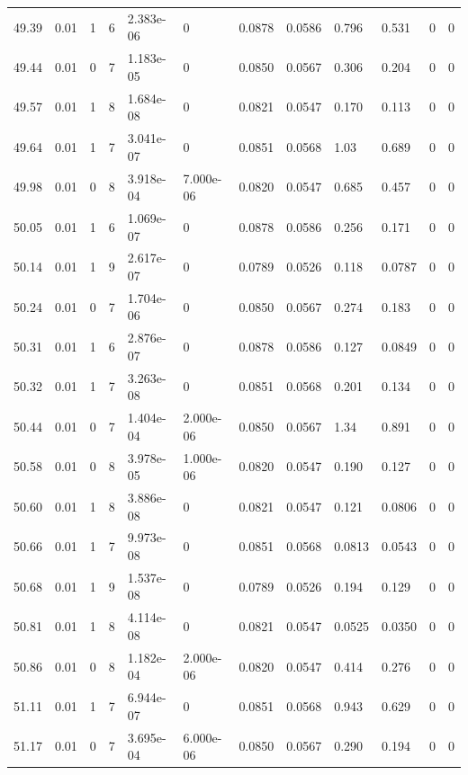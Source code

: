 \documentclass[preview]{standalone}
\begin{document}
{{{{{{{{{{{{{\begin{tabular}{L{1.2cm}C{1.2cm} C{0.3cm}C{0.5cm} C{1.4cm}C{1.4cm} C{1.4cm}C{1.4cm} C{1.6cm}C{1.6cm} C{1.6cm}C{1.6cm}}
  49.39  &  0.01  & 1     &  6 &  2.383e-06  & 0  &  0.0878&   0.0586& 0.796 & 0.531   &  0 & 0  \\ 
  49.44  &  0.01  & 0     &  7 &  1.183e-05  & 0  &  0.0850&   0.0567& 0.306 & 0.204   &  0 & 0  \\ 
  49.57  &  0.01  & 1     &  8 &  1.684e-08  & 0  &  0.0821&   0.0547& 0.170 & 0.113   &  0 & 0  \\ 
  49.64  &  0.01  & 1     &  7 &  3.041e-07  & 0  &  0.0851&   0.0568& 1.03 & 0.689   &  0 & 0  \\ 
  49.98  &  0.01  & 0     &  8 &  3.918e-04  & 7.000e-06  &  0.0820&   0.0547& 0.685 & 0.457   &  0 & 0  \\ 
  50.05  &  0.01  & 1     &  6 &  1.069e-07  & 0  &  0.0878&   0.0586& 0.256 & 0.171   &  0 & 0  \\ 
  50.14  &  0.01  & 1     &  9 &  2.617e-07  & 0  &  0.0789&   0.0526& 0.118 & 0.0787   &  0 & 0  \\ 
  50.24  &  0.01  & 0     &  7 &  1.704e-06  & 0  &  0.0850&   0.0567& 0.274 & 0.183   &  0 & 0  \\ 
  50.31  &  0.01  & 1     &  6 &  2.876e-07  & 0  &  0.0878&   0.0586& 0.127 & 0.0849   &  0 & 0  \\ 
  50.32  &  0.01  & 1     &  7 &  3.263e-08  & 0  &  0.0851&   0.0568& 0.201 & 0.134   &  0 & 0  \\ 
  50.44  &  0.01  & 0     &  7 &  1.404e-04  & 2.000e-06  &  0.0850&   0.0567& 1.34 & 0.891   &  0 & 0  \\ 
  50.58  &  0.01  & 0     &  8 &  3.978e-05  & 1.000e-06  &  0.0820&   0.0547& 0.190 & 0.127   &  0 & 0  \\ 
  50.60  &  0.01  & 1     &  8 &  3.886e-08  & 0  &  0.0821&   0.0547& 0.121 & 0.0806   &  0 & 0  \\ 
  50.66  &  0.01  & 1     &  7 &  9.973e-08  & 0  &  0.0851&   0.0568& 0.0813 & 0.0543   &  0 & 0  \\ 
  50.68  &  0.01  & 1     &  9 &  1.537e-08  & 0  &  0.0789&   0.0526& 0.194 & 0.129   &  0 & 0  \\ 
  50.81  &  0.01  & 1     &  8 &  4.114e-08  & 0  &  0.0821&   0.0547& 0.0525 & 0.0350   &  0 & 0  \\ 
  50.86  &  0.01  & 0     &  8 &  1.182e-04  & 2.000e-06  &  0.0820&   0.0547& 0.414 & 0.276   &  0 & 0  \\ 
  51.11  &  0.01  & 1     &  7 &  6.944e-07  & 0  &  0.0851&   0.0568& 0.943 & 0.629   &  0 & 0  \\ 
  51.17  &  0.01  & 0     &  7 &  3.695e-04  & 6.000e-06  &  0.0850&   0.0567& 0.290 & 0.194   &  0 & 0  \\ 

\end{tabular}}}}}}}}}}}}}}
\end{document}
